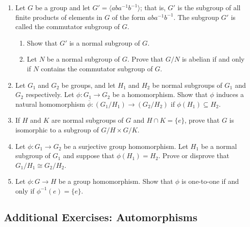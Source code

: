 {\begin{enumerate}
 
\bf\item\rm
Let $G$ be a group and let $G' = \langle aba^{- 1} b^{-1} \rangle$;
that is, $G'$ is the subgroup of all finite products of elements in
$G$ of the form $aba^{-1}b^{-1}$.  The subgroup $G'$ is called the
{\bfi commutator
subgroup\/}\label{commutatorsubgroup} of $G$.  
\begin{enumerate}
 
 \bf\item\rm
Show that $G'$ is a normal subgroup of $G$.

 \bf\item\rm
Let $N$ be  a normal subgroup of $G$.  Prove that $G/N$ is abelian if
and only if $N$ contains the commutator subgroup of $G$.
 
\end{enumerate}

 
\bf\item\rm
Let $G_1$ and $G_2$ be groups, and let $H_1$ and $H_2$ be normal subgroups
of $G_1$ and $G_2$ respectively. Let $\phi : G_1 \rightarrow G_2$ be a
homomorphism. Show that $\phi$ induces a natural homomorphism
$\overline{\phi} : (G_1/H_1) \rightarrow (G_2/H_2)$ if $\phi(H_1) \subseteq
H_2$. 
 
 
\bf\item\rm
If $H$ and $K$ are normal subgroups of $G$ and $H \cap K = \{ e \}$,
prove that $G$ is isomorphic to a subgroup of $G/H \times G/K$.
 
 
 
\bf\item\rm
Let $\phi : G_1 \rightarrow G_2$ be a surjective group homomorphism.
Let $H_1$ be a normal subgroup of $G_1$ and suppose that $\phi(H_1) =
H_2$.  Prove or disprove that $G_1/H_1 \cong G_2/H_2$.
 
 
\bf\item\rm
Let $\phi : G \rightarrow H$ be a group homomorphism.  Show that
$\phi$ is one-to-one if and only if $\phi^{-1}(e) = \{ e \}$.


\end{enumerate}
}
 


\subsection*{Additional Exercises: Automorphisms}
 
